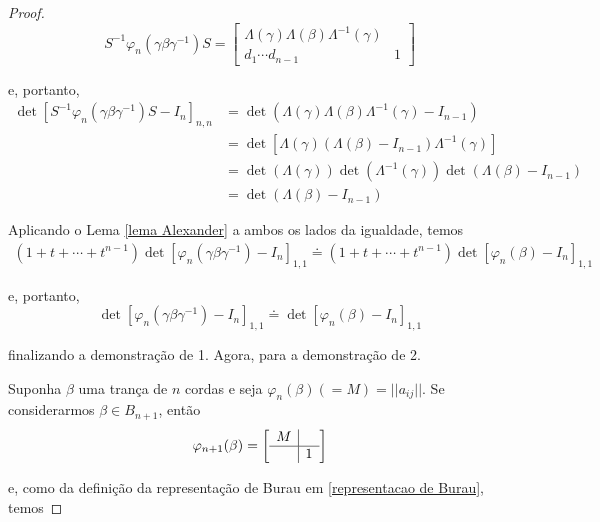 \documentclass[a4paper,portuguese,11pt,twoside, leqno]{book}
\theoremstyle{definition}
\begin{document}
\begin{proof}
\begin{equation*}
		S^{-1}\varphi_n(\gamma\beta\gamma^{-1})S = \left[\begin{array}{c|c}
		\Lambda(\gamma)\Lambda(\beta)\Lambda^{-1}(\gamma) & \\
		\hline 
		d_1\cdots d_{n-1} & 1
		\end{array}\right]
		\end{equation*}
		\par\vspace{0.3cm} e, portanto, 
		\begin{align*}
		\det[S^{-1}\varphi_n(\gamma\beta\gamma^{-1})S - I_n]_{n,n} &= \det(\Lambda(\gamma)\Lambda(\beta)\Lambda^{-1}(\gamma) - I_{n-1}) \\ 
		&= \det[\Lambda(\gamma)(\Lambda(\beta) - I_{n-1})\Lambda^{-1}(\gamma)] \\
		&= \det(\Lambda(\gamma))\det(\Lambda^{-1}(\gamma))\det(\Lambda(\beta) - I_{n-1}) \\
		&= \det(\Lambda(\beta) - I_{n-1})
		\end{align*}
		\par\vspace{0.3cm} Aplicando o Lema \eqref{lema Alexander} a ambos os lados da igualdade, temos
		\begin{align*}
		(1 + t + \cdots + t^{n-1})\det[\varphi_n(\gamma\beta\gamma^{-1}) - I_n]_{1,1}\doteq(1+t+\cdots+t^{n-1})\det[\varphi_n(\beta) - I_n]_{1,1}
		\end{align*}
		\par\vspace{0.3cm} e, portanto, 
		\begin{equation*}
		\det[\varphi_n(\gamma\beta\gamma^{-1}) - I_n]_{1,1}\doteq\det[\varphi_n(\beta) - I_n]_{1,1}
		\end{equation*}
		\par\vspace{0.3cm} finalizando a demonstração de 1. Agora, para a demonstração de 2.
		\par\vspace{0.3cm} Suponha $\beta$ uma trança de $n$ cordas e seja $\varphi_n(\beta)(=M) = ||a_{ij}||$. Se considerarmos $\beta\in B_{n+1}$, então
		\begin{equation*}
		\varphi_{n+1}(\beta) = \left[\begin{array}{c|c}
		M & \\
		\hline
		& 1
		\end{array}\right]
		\end{equation*}
		\par\vspace{0.3cm} e, como da definição da representação de Burau em \eqref{representacao de Burau}, temos

\end{proof}
\end{document}
